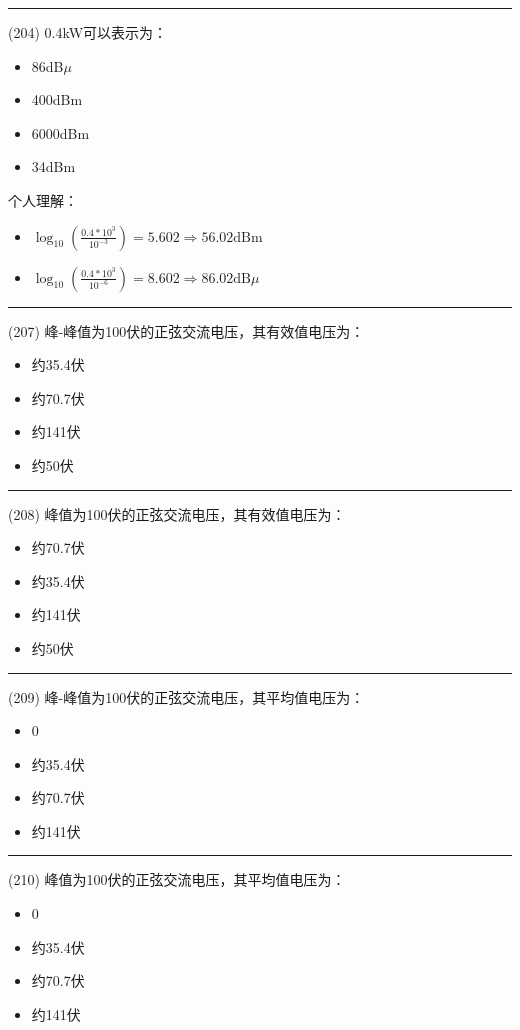 \documentclass[twocolumn,hyperref,UTF8]{ctexart}  %
\begin{document}
\noindent\rule{0.5\textwidth}{1pt}
\heiti (204) 0.4kW可以表示为： \songti {\color{gray} [LK0568] }
\begin{itemize}
	\item  86dB$\mu$  %
	\item  400dBm
	\item  6000dBm
	\item  34dBm
\end{itemize}
个人理解：
\begin{itemize}
	\item  $\log_{10}(\frac{0.4 * 10^3}{10^{-3}}) = 5.602  \Longrightarrow  56.02 \text{dBm}$
	\item  $\log_{10}(\frac{0.4 * 10^3}{10^{-6}}) = 8.602  \Longrightarrow  86.02 \text{dB}\mu$
\end{itemize}




\noindent\rule{0.5\textwidth}{1pt}
\heiti (207) {\color{cyan}峰-峰值}为100伏的正弦交流电压，其{\color{cyan}有效值}电压为： \songti {\color{gray} [LK0512] }
\begin{itemize}
	\item  约35.4伏
	\item  约70.7伏
	\item  约141伏
	\item  约50伏
\end{itemize}


\noindent\rule{0.5\textwidth}{1pt}
\heiti (208) {\color{cyan}峰值}为100伏的正弦交流电压，其{\color{cyan}有效值}电压为： \songti {\color{gray} [LK0513] }
\begin{itemize}
	\item  约70.7伏
	\item  约35.4伏
	\item  约141伏
	\item  约50伏
\end{itemize}


\noindent\rule{0.5\textwidth}{1pt}
\heiti (209) 峰-峰值为100伏的正弦交流电压，其{\color{cyan}平均值}电压为： \songti {\color{gray} [LK0518] }
\begin{itemize}
	\item  0
	\item  约35.4伏
	\item  约70.7伏
	\item  约141伏
\end{itemize}


\noindent\rule{0.5\textwidth}{1pt}
\heiti (210) 峰值为100伏的正弦交流电压，其{\color{cyan}平均值}电压为： \songti {\color{gray} [LK0519] }
\begin{itemize}
	\item  0
	\item  约35.4伏
	\item  约70.7伏
	\item  约141伏
\end{itemize}
\end{document}
